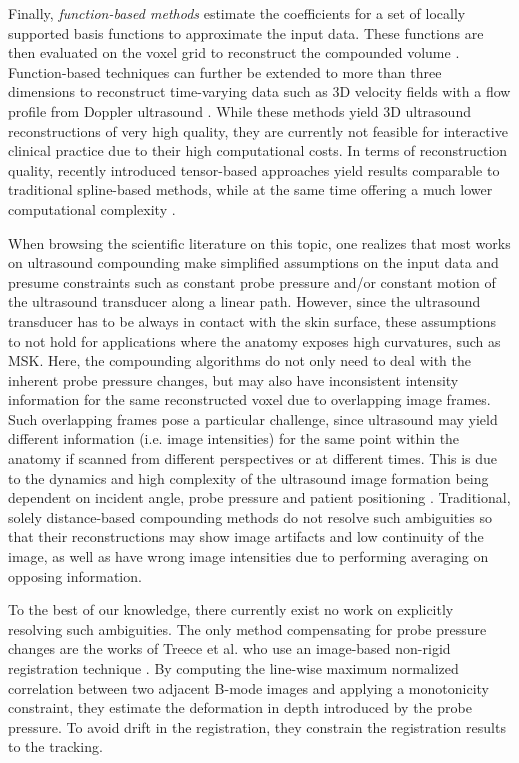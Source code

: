 Finally, \emph{function-based methods} estimate the coefficients for a set of locally supported basis functions to approximate the input data. 
These functions are then evaluated on the voxel grid to reconstruct the compounded volume \cite{Rohling1999,Sanches2002,Klein12}.
Function-based techniques can further be extended to more than three dimensions to reconstruct time-varying data such as 3D velocity fields with a flow profile from Doppler ultrasound \cite{zettinig14}.
While these methods yield 3D ultrasound reconstructions of very high quality, they are currently not feasible for interactive clinical practice due to their high computational costs.
In terms of reconstruction quality, recently introduced tensor-based approaches yield results comparable to traditional spline-based methods, while at the same time offering a much lower computational complexity \cite{Morozov11}.

When browsing the scientific literature on this topic, one realizes that most works on ultrasound compounding make simplified assumptions on the input data and presume constraints such as constant probe pressure and/or constant motion of the ultrasound transducer along a linear path.
However, since the ultrasound transducer has to be always in contact with the skin surface, these assumptions to not hold for applications where the anatomy exposes high curvatures, such as MSK.
Here, the compounding algorithms do not only need to deal with the inherent probe pressure changes, but may also have inconsistent intensity information for the same reconstructed voxel due to overlapping image frames.
Such overlapping frames pose a particular challenge, since ultrasound may yield different information (i.e. image intensities) for the same point within the anatomy if scanned from different perspectives or at different times.
This is due to the dynamics and high complexity of the ultrasound image formation being dependent on incident angle, probe pressure and patient positioning \cite{aldrich07usphysics}.
Traditional, solely distance-based compounding methods do not resolve such ambiguities so that their reconstructions may show image artifacts and low continuity of the image, as well as have wrong image intensities due to performing averaging on opposing information.

To the best of our knowledge, there currently exist no work on explicitly resolving such ambiguities.
The only method compensating for probe pressure changes are the works of Treece et al. who use an image-based non-rigid registration technique \cite{Treece02}.
By computing the line-wise maximum normalized correlation between two adjacent B-mode images and applying a monotonicity constraint, they estimate the deformation in depth introduced by the probe pressure.
To avoid drift in the registration, they constrain the registration results to the tracking.



